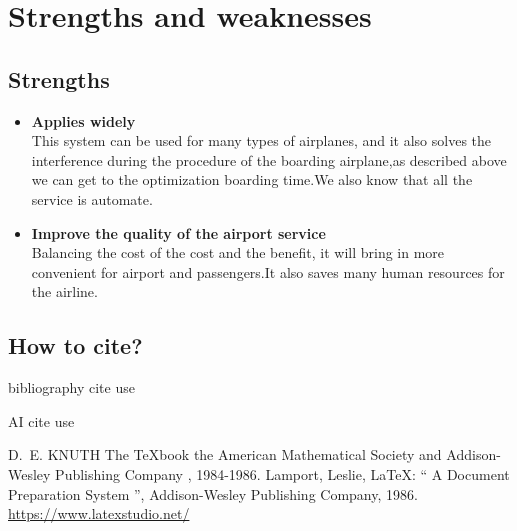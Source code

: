 \documentclass{mcmthesis}
\begin{document}
\section{Strengths and weaknesses}

\subsection{Strengths}
\begin{itemize}
\item \textbf{Applies widely}\\
This  system can be used for many types of airplanes, and it also
solves the interference during  the procedure of the boarding
airplane,as described above we can get to the  optimization
boarding time.We also know that all the service is automate.
\item \textbf{Improve the quality of the airport service}\\
Balancing the cost of the cost and the benefit, it will bring in
more convenient  for airport and passengers.It also saves many
human resources for the airline.
\end{itemize}

\subsection{How to cite?}
bibliography cite use \cite{1,2,3}

AI cite use 

\begin{thebibliography}{99}
 D.~E. KNUTH   The \TeX{}book  the American
Mathematical Society and Addison-Wesley
Publishing Company , 1984-1986.
Lamport, Leslie,  \LaTeX{}: `` A Document Preparation System '',
Addison-Wesley Publishing Company, 1986.
\url{https://www.latexstudio.net/}
\end{thebibliography}
\end{document}

